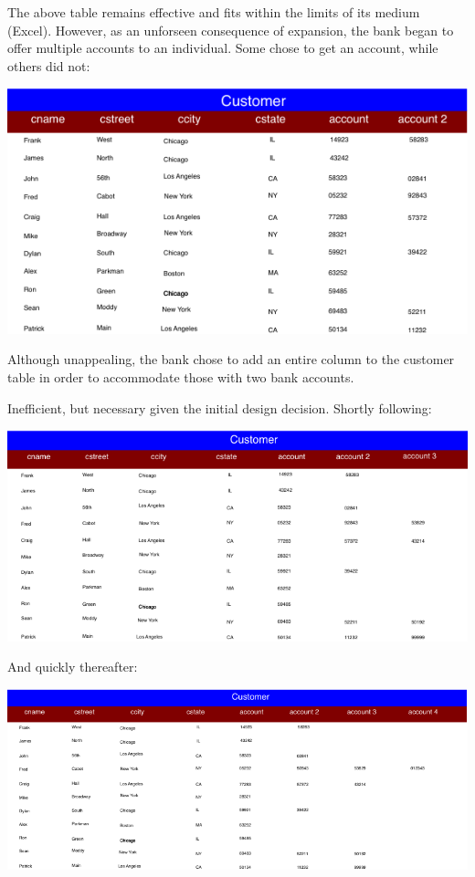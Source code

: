 \documentclass{../sty/acm_proc_article-sp}
\begin{document}
\begin{description}
The above table remains effective and fits within the limits of its medium (Excel). However, as an unforseen consequence of expansion, the bank began to offer multiple accounts to an individual. Some chose to get an account, while others did not:

\includegraphics[scale=.8]{../img/third_table}

Although unappealing, the bank chose to add an entire column to the customer table in order to accommodate those with two bank accounts.

Inefficient, but necessary given the initial design decision. Shortly following:

\includegraphics[scale=.6]{../img/fourth_table}

And quickly thereafter:

\includegraphics[scale=.53]{../img/fifth_table}


\end{description}
\end{document}
